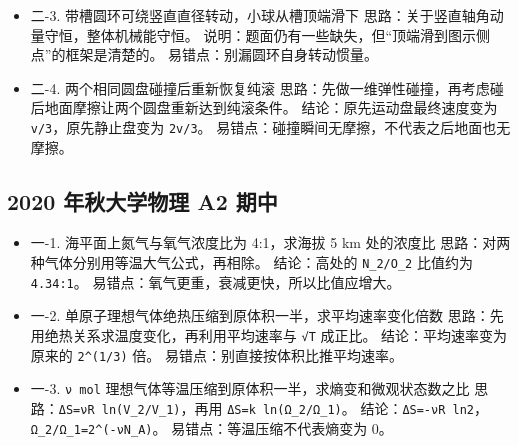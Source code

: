 \documentclass[12pt,a4paper]{ctexart}
\begin{document}
\begin{itemize}

\item 二-3. 带槽圆环可绕竖直直径转动，小球从槽顶端滑下 思路：关于竖直轴角动量守恒，整体机械能守恒。 说明：题面仍有一些缺失，但“顶端滑到图示侧点”的框架是清楚的。 易错点：别漏圆环自身转动惯量。

\end{itemize}

\begin{itemize}

\item 二-4. 两个相同圆盘碰撞后重新恢复纯滚 思路：先做一维弹性碰撞，再考虑碰后地面摩擦让两个圆盘重新达到纯滚条件。 结论：原先运动盘最终速度变为 \texttt{v/3}，原先静止盘变为 \texttt{2v/3}。 易错点：碰撞瞬间无摩擦，不代表之后地面也无摩擦。

\end{itemize}

\subsection{2020 年秋大学物理 A2 期中}

\begin{itemize}

\item 一-1. 海平面上氮气与氧气浓度比为 4:1，求海拔 5 km 处的浓度比 思路：对两种气体分别用等温大气公式，再相除。 结论：高处的 \texttt{N\_2/O\_2} 比值约为 \texttt{4.34:1}。 易错点：氧气更重，衰减更快，所以比值应增大。

\end{itemize}

\begin{itemize}

\item 一-2. 单原子理想气体绝热压缩到原体积一半，求平均速率变化倍数 思路：先用绝热关系求温度变化，再利用平均速率与 \texttt{√T} 成正比。 结论：平均速率变为原来的 \texttt{2\textasciicircum{}(1/3)} 倍。 易错点：别直接按体积比推平均速率。

\end{itemize}

\begin{itemize}

\item 一-3. \texttt{ν mol} 理想气体等温压缩到原体积一半，求熵变和微观状态数之比 思路：\texttt{ΔS=νR ln(V\_2/V\_1)}，再用 \texttt{ΔS=k ln(Ω\_2/Ω\_1)}。 结论：\texttt{ΔS=-νR ln2}，\texttt{Ω\_2/Ω\_1=2\textasciicircum{}(-νN\_A)}。 易错点：等温压缩不代表熵变为 0。

\end{itemize}
\end{document}
